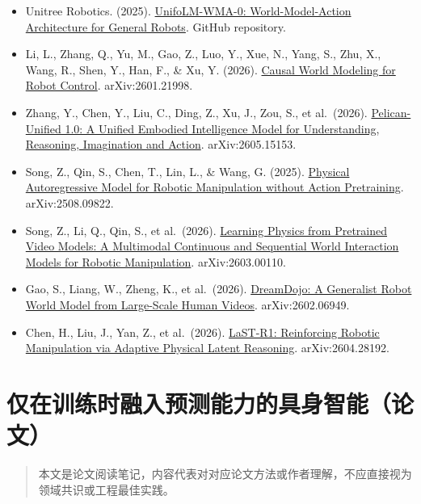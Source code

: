 \begin{itemize}
\tightlist
\item
  Unitree Robotics. (2025). \href{https://github.com/unitreerobotics/unifolm-world-model-action}{UnifoLM-WMA-0: World-Model-Action Architecture for General Robots}. GitHub repository.
\item
  Li, L., Zhang, Q., Yu, M., Gao, Z., Luo, Y., Xue, N., Yang, S., Zhu, X., Wang, R., Shen, Y., Han, F., \& Xu, Y. (2026). \href{https://arxiv.org/abs/2601.21998}{Causal World Modeling for Robot Control}. arXiv:2601.21998.
\item
  Zhang, Y., Chen, Y., Liu, C., Ding, Z., Xu, J., Zou, S., et al.~(2026). \href{https://arxiv.org/abs/2605.15153}{Pelican-Unified 1.0: A Unified Embodied Intelligence Model for Understanding, Reasoning, Imagination and Action}. arXiv:2605.15153.
\item
  Song, Z., Qin, S., Chen, T., Lin, L., \& Wang, G. (2025). \href{https://arxiv.org/abs/2508.09822}{Physical Autoregressive Model for Robotic Manipulation without Action Pretraining}. arXiv:2508.09822.
\item
  Song, Z., Li, Q., Qin, S., et al.~(2026). \href{https://arxiv.org/abs/2603.00110}{Learning Physics from Pretrained Video Models: A Multimodal Continuous and Sequential World Interaction Models for Robotic Manipulation}. arXiv:2603.00110.
\item
  Gao, S., Liang, W., Zheng, K., et al.~(2026). \href{https://arxiv.org/abs/2602.06949}{DreamDojo: A Generalist Robot World Model from Large-Scale Human Videos}. arXiv:2602.06949.
\item
  Chen, H., Liu, J., Yan, Z., et al.~(2026). \href{https://arxiv.org/abs/2604.28192}{LaST-R1: Reinforcing Robotic Manipulation via Adaptive Physical Latent Reasoning}. arXiv:2604.28192.
\end{itemize}

\clearpage

\hypertarget{ux4ec5ux5728ux8badux7ec3ux65f6ux878dux5165ux9884ux6d4bux80fdux529bux7684ux5177ux8eabux667aux80fdux8bbaux6587}{%
\section{仅在训练时融入预测能力的具身智能（论文）}\label{ux4ec5ux5728ux8badux7ec3ux65f6ux878dux5165ux9884ux6d4bux80fdux529bux7684ux5177ux8eabux667aux80fdux8bbaux6587}}

\begin{quote}
本文是论文阅读笔记，内容代表对对应论文方法或作者理解，不应直接视为领域共识或工程最佳实践。
\end{quote}

